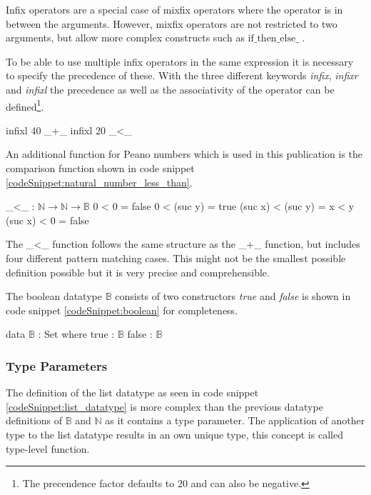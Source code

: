 Infix operators are a special case of mixfix operators where the operator is in between the arguments.
However, mixfix operators are not restricted to two arguments, but allow more complex constructs such as $\text{if\_then\_else\_}$ \cite{AgdaReadTheDocs}.

To be able to use multiple infix operators in the same expression it is necessary to specify the precedence of these.
With the three different keywords \emph{infix}, \emph{infixr} and \emph{infixl} the precedence as well as the associativity of the operator can be defined\footnote{The precendence factor defaults to 20 and can also be negative.}.

\begin{codesnippet}[mathescape=true, caption={Precedence and associativity of some Peano number operators}, label={codeSnippet:natural_number_precedence}]
infixl 40 _+_
infixl 20 _<_
\end{codesnippet}

An additional function for Peano numbers which is used in this publication is the comparison function shown in code snippet \ref{codeSnippet:natural_number_less_than}.

\begin{codesnippet}[mathescape=true, caption={Peano numbers less-than}, label={codeSnippet:natural_number_less_than}]
_<_ : $\mathbb{N} \rightarrow \mathbb{N} \rightarrow \mathbb{B}$
0 < 0 = false
0 < (suc y) = true
(suc x) < (suc y) = x < y
(suc x) < 0 = false
\end{codesnippet}

The \_\textless\_ function follows the same structure as the \_+\_ function, but includes four different pattern matching cases. 
This might not be the smallest possible definition possible but it is very precise and comprehensible.

The boolean datatype $\mathbb{B}$ consists of two constructors \emph{true} and \emph{false} is shown in code snippet \ref{codeSnippet:boolean} for completeness.

\begin{codesnippet}[mathescape=true, caption={Definition of the boolean datatype in Agda}, label={codeSnippet:boolean}]
data $\mathbb{B}$ : Set where
  true : $\mathbb{B}$
  false  : $\mathbb{B}$
\end{codesnippet}

\subsubsection{Type Parameters}
The definition of the list datatype as seen in code snippet \ref{codeSnippet:list_datatype} is more complex than the previous datatype definitions of $\mathbb{B}$ and $\mathbb{N}$ as it contains a type parameter.
The application of another type to the list datatype results in an own unique type, this concept is called type-level function.

